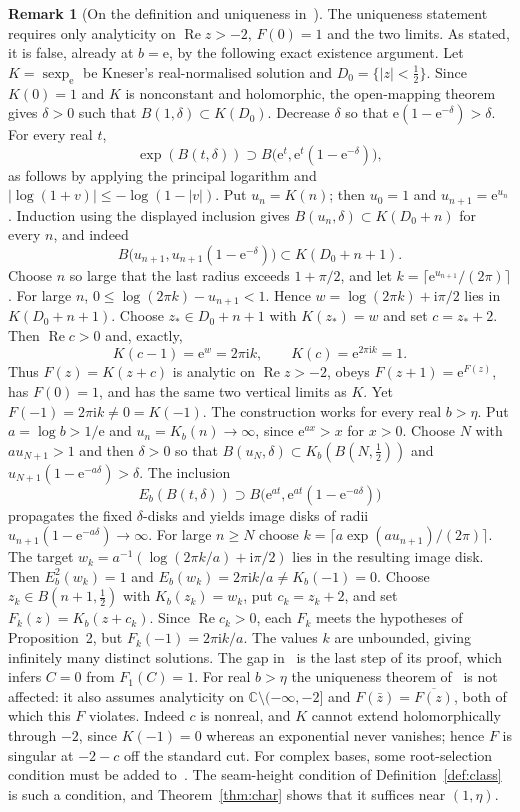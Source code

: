\documentclass[11pt]{amsart}
\theoremstyle{definition}
\newtheorem{remark}[theorem]{Remark}
\newcommand{\eee}{\mathrm{e}}
\newcommand{\ii}{\mathrm{i}}
\begin{document}
\begin{remark}[On the definition and uniqueness in~\cite{Paulsen2019}]
The uniqueness statement~\cite[Prop.~2]{Paulsen2019} requires only
analyticity on $\operatorname{Re}z>-2$, $F(0)=1$ and the two limits.  As stated,
it is false, already at $b=\eee$, by the following exact existence argument.
Let $K=\operatorname{sexp}_{\eee}$ be Kneser's real-normalised solution and
$D_0=\{|z|<\tfrac12\}$.  Since $K(0)=1$ and $K$ is nonconstant and
holomorphic, the open-mapping theorem gives $\delta>0$ such that
$B(1,\delta)\subset K(D_0)$.  Decrease $\delta$ so that
$\eee(1-\eee^{-\delta})>\delta$.  For every real $t$,
\[
 \exp(B(t,\delta))\supset
 B\bigl(\eee^t,\eee^t(1-\eee^{-\delta})\bigr),
\]
as follows by applying the principal logarithm and
$|\log(1+v)|\le-\log(1-|v|)$.  Put $u_n=K(n)$; then $u_0=1$ and
$u_{n+1}=\eee^{u_n}$.  Induction using the displayed inclusion gives
$B(u_n,\delta)\subset K(D_0+n)$ for every $n$, and indeed
\[
 B\bigl(u_{n+1},u_{n+1}(1-\eee^{-\delta})\bigr)
 \subset K(D_0+n+1).
\]
Choose $n$ so large that the last radius exceeds $1+\pi/2$, and let
$k=\lceil\eee^{u_{n+1}}/(2\pi)\rceil$.  For large $n$,
$0\le\log(2\pi k)-u_{n+1}<1$.  Hence
$w=\log(2\pi k)+\ii\pi/2$ lies in $K(D_0+n+1)$.  Choose
$z_*\in D_0+n+1$ with $K(z_*)=w$ and set $c=z_*+2$.
Then $\operatorname{Re}c>0$ and, exactly,
\[
 K(c-1)=\eee^w=2\pi\ii k,\qquad
 K(c)=\eee^{2\pi\ii k}=1.
\]
Thus $F(z)=K(z+c)$ is analytic on $\operatorname{Re}z>-2$, obeys
$F(z+1)=\eee^{F(z)}$, has $F(0)=1$, and has the same two vertical limits
as $K$.  Yet $F(-1)=2\pi\ii k\ne0=K(-1)$.
The construction works for every real $b>\eta$.  Put $a=\log b>1/\eee$
and $u_n=K_b(n)\to\infty$, since $\eee^{ax}>x$ for $x>0$.
Choose $N$ with $a u_{N+1}>1$ and then
$\delta>0$ so that $B(u_N,\delta)\subset K_b(B(N,\tfrac12))$ and
$u_{N+1}(1-\eee^{-a\delta})>\delta$.  The inclusion
\[
 E_b(B(t,\delta))\supset
 B\bigl(\eee^{at},\eee^{at}(1-\eee^{-a\delta})\bigr)
\]
propagates the fixed $\delta$-disks and yields image disks of radii
$u_{n+1}(1-\eee^{-a\delta})\to\infty$.  For large
$n\ge N$ choose $k=\lceil a\exp(a u_{n+1})/(2\pi)\rceil$.
The target $w_k=a^{-1}(\log(2\pi k/a)+\ii\pi/2)$ lies in the
resulting image disk.  Then
$E_b^2(w_k)=1$ and $E_b(w_k)=2\pi\ii k/a\ne K_b(-1)=0$.
Choose $z_k\in B(n+1,\tfrac12)$ with $K_b(z_k)=w_k$, put $c_k=z_k+2$,
and set $F_k(z)=K_b(z+c_k)$.  Since $\operatorname{Re}c_k>0$, each $F_k$
meets the hypotheses of Proposition~2, but $F_k(-1)=2\pi\ii k/a$.
The values $k$ are unbounded, giving infinitely many distinct solutions.
The gap in~\cite[Prop.~2]{Paulsen2019} is the last step of its proof,
which infers $C=0$ from $F_1(C)=1$.  For real $b>\eta$ the uniqueness
theorem of~\cite{PaulsenCowgill2017} is not affected: it also assumes
analyticity on $\mathbb C\setminus(-\infty,-2]$ and $F(\bar z)=\overline{F(z)}$,
both of which this $F$ violates.  Indeed $c$ is nonreal, and $K$ cannot
extend holomorphically through $-2$, since $K(-1)=0$ whereas an exponential
never vanishes; hence $F$ is singular at $-2-c$ off the standard cut.
For complex bases, some root-selection
condition must be added to~\cite[Prop.~2]{Paulsen2019}.  The seam-height
condition of Definition~\ref{def:class} is such a condition, and
Theorem~\ref{thm:char} shows that it suffices near $(1,\eta)$.


\end{remark}
\end{document}
